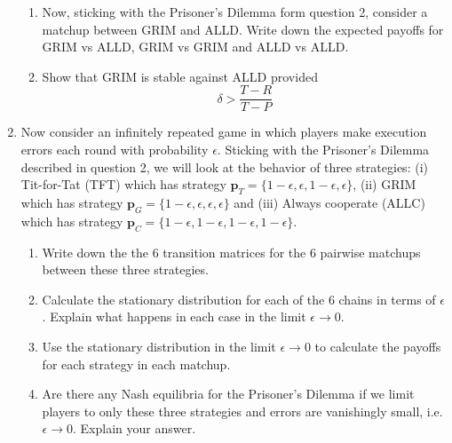 \documentclass[12pt]{article}
\begin{document}
\begin{enumerate}
\begin{enumerate}
\item Now, sticking with the Prisoner's Dilemma form question 2, consider a matchup between GRIM and ALLD. Write down the expected payoffs for GRIM vs ALLD, GRIM vs GRIM and ALLD vs ALLD.
\item Show that GRIM is stable against ALLD provided 
$$
\delta > \frac{T - R}{T-P}
$$
\end{enumerate}
\item Now consider an infinitely repeated game in which players make execution errors each round with probability $\epsilon$. Sticking with the Prisoner's Dilemma described in question 2, we will look at the behavior of three strategies: (i) Tit-for-Tat (TFT) which has strategy $\mathbf{p}_T=\{1-\epsilon, \epsilon, 1-\epsilon, \epsilon\}$, (ii) GRIM which has strategy $\mathbf{p}_G=\{1-\epsilon, \epsilon, \epsilon, \epsilon\}$ and (iii) Always cooperate (ALLC) which has strategy $\mathbf{p}_C=\{1-\epsilon, 1-\epsilon, 1-\epsilon, 1-\epsilon\}$.
\begin{enumerate}
\item Write down the the 6 transition matrices for the 6 pairwise matchups between these three strategies.
\item Calculate the stationary distribution for each of the 6 chains in terms of $\epsilon$. Explain what happens in each case in the limit $\epsilon\to 0$.
\item Use the stationary distribution in the limit $\epsilon \to 0$ to calculate the payoffs for each strategy in each matchup.
\item Are there any Nash equilibria for the Prisoner's Dilemma if we limit players to only these three strategies and errors are vanishingly small, i.e. $\epsilon \to 0$. Explain your answer.  

\end{enumerate}

\end{enumerate}
\end{document}
